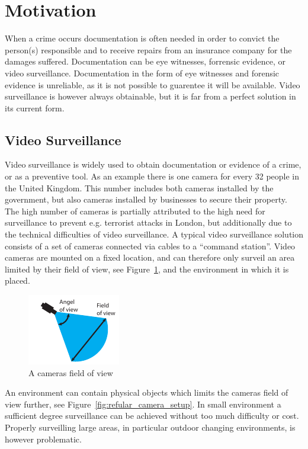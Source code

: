 \section{Motivation}
When a crime occurs documentation is often needed in order to convict the person(s) responsible and to receive repairs from an insurance company for the damages suffered.
Documentation can be eye witnesses, forrensic evidence, or video surveillance.
Documentation in the form of eye witnesses and forensic evidence is unreliable, as it is not possible to guarentee it will be available.
Video surveillance is however always obtainable, but it is far from a perfect solution in its current form.

\subsection{Video Surveillance}
Video surveillance is widely used to obtain documentation or evidence of a crime, or as a preventive tool.
As an example there is one camera for every 32 people in the United Kingdom\citep{london_camera_surveillance}.
This number includes both cameras installed by the government, but also cameras installed by businesses to secure their property.
The high number of cameras is partially attributed to the high need for surveillance to prevent e.g. terrorist attacks in London, but additionally due to the technical difficulties of video surveillance.
A typical video surveillance solution consists of a set of cameras connected via cables to a ``command station''.
Video cameras are mounted on a fixed location, and can therefore only surveil an area limited by their field of view, see Figure~\ref{fig:camera_properties}, and the environment in which it is placed.

\begin{figure}[htb]
    \centering
    \includegraphics[scale=1.8]{gfx/camera_properties.pdf}
    \caption{A cameras field of view}
    \label{fig:camera_properties}
\end{figure}

An environment can contain physical objects which limits the cameras field of view further, see Figure~\ref{fig:refular_camera_setup}.
In small environment a sufficient degree surveillance can be achieved without too much difficulty or cost.
Properly surveilling large areas, in particular outdoor changing environments, is however problematic.

